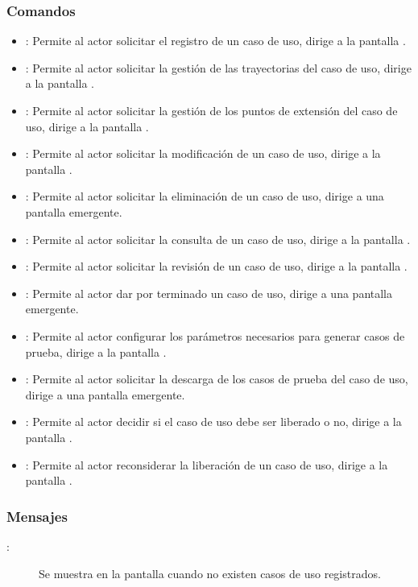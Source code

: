

\subsubsection{Comandos}
\begin{itemize}
	\item {}: Permite al actor solicitar el registro de un caso de uso, dirige a la pantalla .
	\item {}: Permite al actor solicitar la gestión de las trayectorias del caso de uso, dirige a la pantalla .
	\item {}: Permite al actor solicitar la gestión de los puntos de extensión del caso de uso, dirige a la pantalla .	
	\item {}: Permite al actor solicitar la modificación de un caso de uso, dirige a la pantalla .
	\item {}: Permite al actor solicitar la eliminación de un caso de uso, dirige a una pantalla emergente.
	\item {}: Permite al actor solicitar la consulta de un caso de uso, dirige a la pantalla .
	\item {}: Permite al actor solicitar la revisión de un caso de uso, dirige a la pantalla .
	\item {}: Permite al actor dar por terminado un caso de uso, dirige a una pantalla emergente.
	\item {}: Permite al actor configurar los parámetros necesarios para generar casos de prueba, dirige a la pantalla .
	\item {}: Permite al actor solicitar la descarga de los casos de prueba del caso de uso, dirige a una pantalla emergente.
	\item {}: Permite al actor decidir si el caso de uso debe ser liberado o no, dirige a la pantalla .
	\item {}: Permite al actor reconsiderar la liberación de un caso de uso, dirige a la pantalla .
	
	
	
	
\end{itemize}

\subsubsection{Mensajes}

	
\begin{description}
	\item[:] Se muestra en la pantalla  cuando no existen casos de uso registrados.
\end{description}
